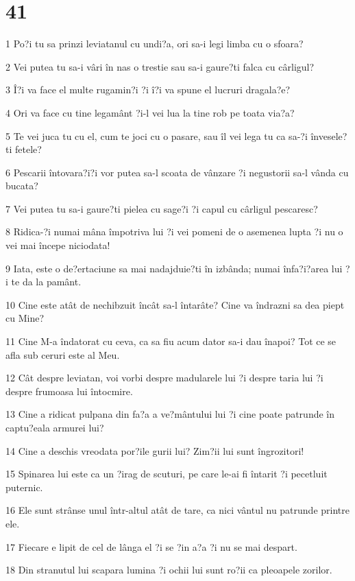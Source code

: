 \chapter{41}

\par 1 Po?i tu sa prinzi leviatanul cu undi?a, ori sa-i legi limba cu o sfoara?
\par 2 Vei putea tu sa-i vâri în nas o trestie sau sa-i gaure?ti falca cu cârligul?
\par 3 Î?i va face el multe rugamin?i ?i î?i va spune el lucruri dragala?e?
\par 4 Ori va face cu tine legamânt ?i-l vei lua la tine rob pe toata via?a?
\par 5 Te vei juca tu cu el, cum te joci cu o pasare, sau îl vei lega tu ca sa-?i învesele?ti fetele?
\par 6 Pescarii întovara?i?i vor putea sa-l scoata de vânzare ?i negustorii sa-l vânda cu bucata?
\par 7 Vei putea tu sa-i gaure?ti pielea cu sage?i ?i capul cu cârligul pescaresc?
\par 8 Ridica-?i numai mâna împotriva lui ?i vei pomeni de o asemenea lupta ?i nu o vei mai începe niciodata!
\par 9 Iata, este o de?ertaciune sa mai nadajduie?ti în izbânda; numai înfa?i?area lui ?i te da la pamânt.
\par 10 Cine este atât de nechibzuit încât sa-l întarâte? Cine va îndrazni sa dea piept cu Mine?
\par 11 Cine M-a îndatorat cu ceva, ca sa fiu acum dator sa-i dau înapoi? Tot ce se afla sub ceruri este al Meu.
\par 12 Cât despre leviatan, voi vorbi despre madularele lui ?i despre taria lui ?i despre frumoasa lui întocmire.
\par 13 Cine a ridicat pulpana din fa?a a ve?mântului lui ?i cine poate patrunde în captu?eala armurei lui?
\par 14 Cine a deschis vreodata por?ile gurii lui? Zim?ii lui sunt îngrozitori!
\par 15 Spinarea lui este ca un ?irag de scuturi, pe care le-ai fi întarit ?i pecetluit puternic.
\par 16 Ele sunt strânse unul într-altul atât de tare, ca nici vântul nu patrunde printre ele.
\par 17 Fiecare e lipit de cel de lânga el ?i se ?in a?a ?i nu se mai despart.
\par 18 Din stranutul lui scapara lumina ?i ochii lui sunt ro?ii ca pleoapele zorilor.
